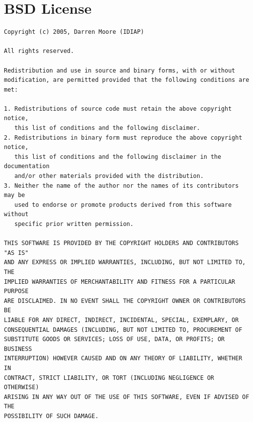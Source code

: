 \documentclass[a4paper,12pt]{report}
\begin{document}
\newpage

\begin{center}
\end{center}


\chapter{BSD License}
\label{app:license}

\begin{verbatim}
Copyright (c) 2005, Darren Moore (IDIAP)

All rights reserved.

Redistribution and use in source and binary forms, with or without
modification, are permitted provided that the following conditions are met:

1. Redistributions of source code must retain the above copyright notice,
   this list of conditions and the following disclaimer. 
2. Redistributions in binary form must reproduce the above copyright notice,
   this list of conditions and the following disclaimer in the documentation
   and/or other materials provided with the distribution. 
3. Neither the name of the author nor the names of its contributors may be
   used to endorse or promote products derived from this software without
   specific prior written permission. 

THIS SOFTWARE IS PROVIDED BY THE COPYRIGHT HOLDERS AND CONTRIBUTORS "AS IS"
AND ANY EXPRESS OR IMPLIED WARRANTIES, INCLUDING, BUT NOT LIMITED TO, THE
IMPLIED WARRANTIES OF MERCHANTABILITY AND FITNESS FOR A PARTICULAR PURPOSE
ARE DISCLAIMED. IN NO EVENT SHALL THE COPYRIGHT OWNER OR CONTRIBUTORS BE
LIABLE FOR ANY DIRECT, INDIRECT, INCIDENTAL, SPECIAL, EXEMPLARY, OR
CONSEQUENTIAL DAMAGES (INCLUDING, BUT NOT LIMITED TO, PROCUREMENT OF
SUBSTITUTE GOODS OR SERVICES; LOSS OF USE, DATA, OR PROFITS; OR BUSINESS
INTERRUPTION) HOWEVER CAUSED AND ON ANY THEORY OF LIABILITY, WHETHER IN
CONTRACT, STRICT LIABILITY, OR TORT (INCLUDING NEGLIGENCE OR OTHERWISE)
ARISING IN ANY WAY OUT OF THE USE OF THIS SOFTWARE, EVEN IF ADVISED OF THE
POSSIBILITY OF SUCH DAMAGE.
\end{verbatim}




\end{document}
